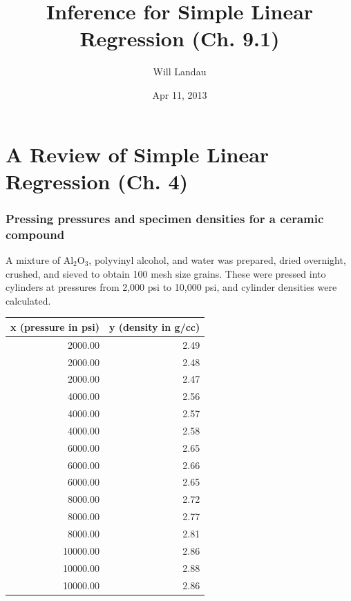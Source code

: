 \documentclass[handout]{beamer}\usepackage{graphicx, color}
\title{Inference for Simple Linear Regression (Ch. 9.1)}
\author{Will Landau}
\date{Apr 11, 2013}
\institute{Iowa State University}
\numberwithin{equation}{section}
\begin{document}
\begin{frame}
\titlepage
 \end{frame}
 

\section{A Review of Simple Linear Regression (Ch. 4)}

\begin{frame}[fragile]
\frametitle{\small Pressing pressures and specimen densities for a ceramic compound}
\scriptsize
A mixture of $\text{Al}_2\text{O}_3$, polyvinyl alcohol, and water was prepared, dried overnight, crushed, and sieved to obtain 100 mesh size grains. These were pressed into cylinders at pressures from 2,000 psi to 10,000 psi, and cylinder densities were calculated. 

\begin{table}[ht]
\centering
\begin{tabular}{rr}
 x (pressure in psi) & y (density in g/cc) \\ 
  \hline
2000.00 & 2.49 \\ 
  2000.00 & 2.48 \\ 
  2000.00 & 2.47 \\ 
  4000.00 & 2.56 \\ 
  4000.00 & 2.57 \\ 
  4000.00 & 2.58 \\ 
  6000.00 & 2.65 \\ 
  6000.00 & 2.66 \\ 
  6000.00 & 2.65 \\ 
  8000.00 & 2.72 \\ 
  8000.00 & 2.77 \\ 
  8000.00 & 2.81 \\ 
  10000.00 & 2.86 \\ 
  10000.00 & 2.88 \\ 
  10000.00 & 2.86 \\ 
  \end{tabular}
\end{table}



\end{frame}
\end{document}
